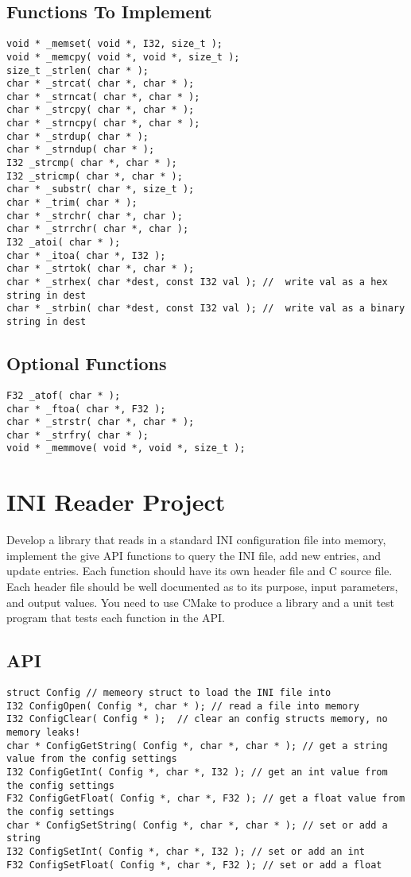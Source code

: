 \documentclass[a4paper,12pt]{report}
\begin{document}
\subsection*{Functions To Implement}
\begin{lstlisting}
void * _memset( void *, I32, size_t );
void * _memcpy( void *, void *, size_t );
size_t _strlen( char * );
char * _strcat( char *, char * );
char * _strncat( char *, char * );
char * _strcpy( char *, char * );
char * _strncpy( char *, char * );
char * _strdup( char * );
char * _strndup( char * );
I32 _strcmp( char *, char * );
I32 _stricmp( char *, char * );
char * _substr( char *, size_t );
char * _trim( char * );
char * _strchr( char *, char );
char * _strrchr( char *, char );
I32 _atoi( char * );
char * _itoa( char *, I32 );
char * _strtok( char *, char * );
char * _strhex( char *dest, const I32 val ); //  write val as a hex string in dest
char * _strbin( char *dest, const I32 val ); //  write val as a binary string in dest
\end{lstlisting}

\subsection*{Optional Functions}
\begin{lstlisting}
F32 _atof( char * );
char * _ftoa( char *, F32 );
char * _strstr( char *, char * );
char * _strfry( char * ); 
void * _memmove( void *, void *, size_t );
\end{lstlisting}

\pagebreak
\section*{INI Reader Project}
Develop a library that reads in a standard INI configuration file into memory, implement the give API functions to query the INI file, add new entries, and update entries.  Each function should have its own header file and C source file.  Each header file should be well documented as to its purpose, input parameters, and output values.  You need to use CMake to produce a library and a unit test program that tests each function in the API.

\subsection*{API}
\begin{lstlisting}
struct Config // memeory struct to load the INI file into
I32 ConfigOpen( Config *, char * ); // read a file into memory
I32 ConfigClear( Config * );  // clear an config structs memory, no memory leaks!
char * ConfigGetString( Config *, char *, char * ); // get a string value from the config settings
I32 ConfigGetInt( Config *, char *, I32 ); // get an int value from the config settings
F32 ConfigGetFloat( Config *, char *, F32 ); // get a float value from the config settings
char * ConfigSetString( Config *, char *, char * ); // set or add a string
I32 ConfigSetInt( Config *, char *, I32 ); // set or add an int
F32 ConfigSetFloat( Config *, char *, F32 ); // set or add a float
\end{lstlisting}
\end{document}

